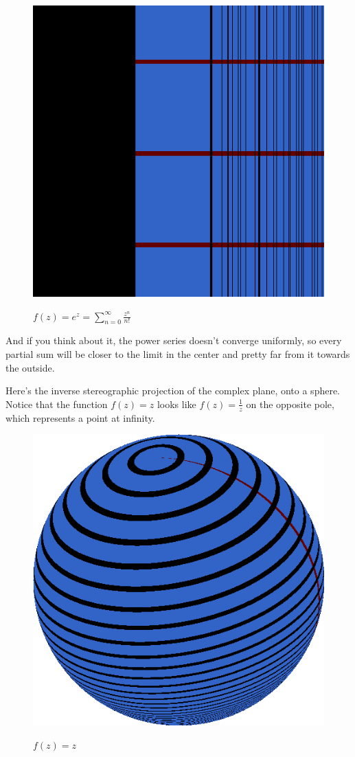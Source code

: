 \documentclass[xhtml, mathjax]{article}
\begin{document}
    \begin{figure}
      \centering
      \includegraphics{exp.gif}\par
      $f(z) = e^z = \sum_{n=0}^\infty \frac{z^n}{n!}$
    \end{figure}

  And if you think about it, the power series doesn't converge uniformly, so
  every partial sum will be closer to the limit in the center and pretty far
  from it towards the outside.

  Here's the inverse stereographic projection of the complex plane,
  onto a sphere. Notice that the function $f(z) = z$ looks like $f(z) =
  \frac{1}{z}$ on the opposite pole, which represents a point at infinity.

    \begin{figure}
      \centering
      \includegraphics{z_sphere.gif}\par
      $f(z) = z$
    \end{figure}

  
\end{document}
